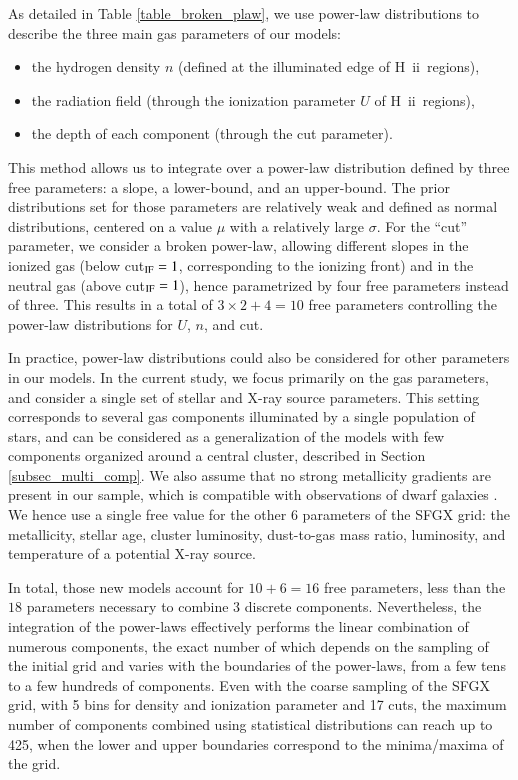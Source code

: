 \documentclass{aa}
\newcommand{\hii}{H~{\sc ii}}
\begin{document}
As detailed in Table \ref{table_broken_plaw}, we use power-law distributions to describe the three main gas parameters of our models:
\begin{itemize}
    \item the hydrogen density $n$ (defined at the illuminated edge of \hii\ regions),
    \item the radiation field (through the ionization parameter $U$ of \hii\ regions),
    \item the depth of each component (through the cut parameter).
\end{itemize}
This method allows us to integrate over a power-law distribution defined by three free parameters: a slope, a lower-bound, and an upper-bound. The prior distributions set for those parameters are relatively weak and defined as normal distributions, centered on a value $\mu$ with a relatively large $\sigma$. For the “cut” parameter, we consider a broken power-law, allowing different slopes in the ionized gas (below cut$_{\rm IF}=1$, corresponding to the ionizing front) and in the neutral gas (above cut$_{\rm IF}=1$), hence parametrized by four free parameters instead of three. This results in a total of $3\times2+4= 10$ free parameters controlling the power-law distributions for $U$, $n$, and cut.

In practice, power-law distributions could also be considered for other parameters in our models. In the current study, we focus primarily on the gas parameters, and consider a single set of stellar and X-ray source parameters. This setting corresponds to several gas components illuminated by a single population of stars, and can be considered as a generalization of the models with few components organized around a central cluster, described in Section \ref{subsec_multi_comp}. We also assume that no strong metallicity gradients are present in our sample, which is compatible with observations of dwarf galaxies \citep[e.g.,][]{Lagos_Papaderos_2013}. We hence use a single free value for the other 6 parameters of the SFGX grid: the metallicity, stellar age, cluster luminosity, dust-to-gas mass ratio, luminosity, and temperature of a potential X-ray source. 

In total, those new models account for $10+6=16$ free parameters, less than the $18$ parameters necessary to combine 3 discrete components. Nevertheless, the integration of the power-laws effectively performs the linear combination of numerous components, the exact number of which depends on the sampling of the initial grid and varies with the boundaries of the power-laws, from a few tens to a few hundreds of components. Even with the coarse sampling of the SFGX grid, with 5 bins for density and ionization parameter and 17 cuts, the maximum number of components combined using statistical distributions can reach up to 425, when the lower and upper boundaries correspond to the minima/maxima of the grid.
\end{document}
